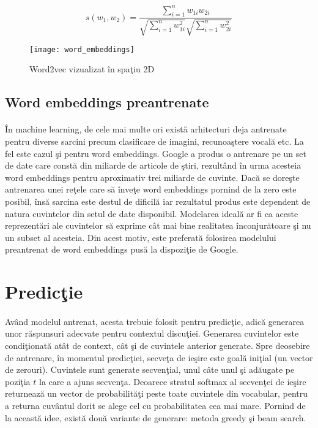 \begin{equation}
s(w_{1}, w_{2}) = \frac{\sum_{i=1}^{n}w_{1i}w_{2i}}{\sqrt{\sum_{i=1}^{n}w_{1i}^{2}}\sqrt{\sum_{i=1}^{n}w_{2i}^{2}}}
\end{equation}

\begin{figure}[H]
\centering
\texttt{[image: word\_embeddings]}
\caption{Word2vec vizualizat \^ in spa\c tiu 2D}
\end{figure} 

\subsection{Word embeddings preantrenate}

\paragraph{}
\^ In machine learning, de cele mai multe ori exist\u a arhitecturi deja antrenate pentru diverse sarcini precum clasificare de imagini, recunoa\c stere vocal\u a etc. La fel este cazul \c si pentru word embeddings. Google a produs o antrenare pe un set de date care const\u a din miliarde de articole de \c stiri, rezult\^ and \^ in urma acesteia word embeddings pentru aproximativ trei miliarde de cuvinte. Dac\u a se dore\c ste antrenarea unei re\c tele care s\u a \^ inve\c te word embeddings pornind de la zero este posibil, \^ ins\u a sarcina este destul de dificil\u a iar rezultatul produs este dependent de natura cuvintelor din setul de date disponibil. Modelarea ideal\u a ar fi ca aceste reprezent\u ari ale cuvintelor s\u a exprime c\^ at mai bine realitatea \^ inconjur\u atoare \c si nu un subset al acesteia. Din acest motiv, este preferat\u a folosirea modelului preantrenat de word embeddings pus\u a la dispozi\c tie de Google.

\section{Predic\c tie}

\paragraph{}
Av\^ and modelul antrenat, acesta trebuie folosit pentru predic\c tie, adic\u a generarea unor r\u aspunsuri adecvate pentru contextul discu\c tiei. Generarea cuvintelor este condi\c tionat\u a at\^ at de context, c\^ at \c si de cuvintele anterior generate. Spre deosebire de antrenare, \^ in momentul predic\c tiei, secve\c ta de ie\c sire este goal\u a ini\c tial (un vector de zerouri). Cuvintele sunt generate secven\c tial, unul c\^ ate unul \c si ad\u augate pe pozi\c tia \(t\) la care a ajuns secven\c ta. Deoarece stratul softmax al secven\c tei de ie\c sire returneaz\u a un vector de probabilit\u a\c ti peste toate cuvintele din vocabular, pentru a returna cuv\^ antul dorit se alege cel cu probabilitatea cea mai mare. Pornind de la aceast\u a idee, exist\u a dou\u a variante de generare: metoda greedy \c si beam search.

